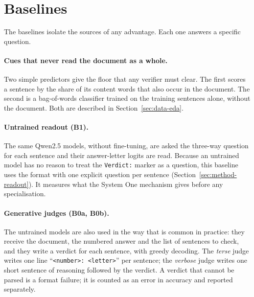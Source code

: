 \section{Baselines}
\label{sec:setup-baselines}

The baselines isolate the sources of any advantage. Each one answers a specific question.

\paragraph{Cues that never read the document as a whole.} Two simple predictors give the floor that any verifier must
clear. The first scores a sentence by the share of its content words that also occur in the document. The second is a
bag-of-words classifier trained on the training sentences alone, without the document. Both are described in
Section~\ref{sec:data-eda}.

\paragraph{Untrained readout (B1).} The same Qwen2.5 models, without fine-tuning, are asked the three-way question for
each sentence and their answer-letter logits are read. Because an untrained model has no reason to treat the
\texttt{Verdict:} marker as a question, this baseline uses the format with one explicit question per sentence
(Section~\ref{sec:method-readout}). It measures what the System One mechanism gives before any specialisation.

\paragraph{Generative judges (B0a, B0b).} The untrained models are also used in the way that is common in practice:
they receive the document, the numbered answer and the list of sentences to check, and they write a verdict for each
sentence, with greedy decoding. The \emph{terse} judge writes one line ``\texttt{<number>: <letter>}'' per sentence;
the \emph{verbose} judge writes one short sentence of reasoning followed by the verdict. A verdict that cannot be
parsed is a format failure; it is counted as an error in accuracy and reported separately.

